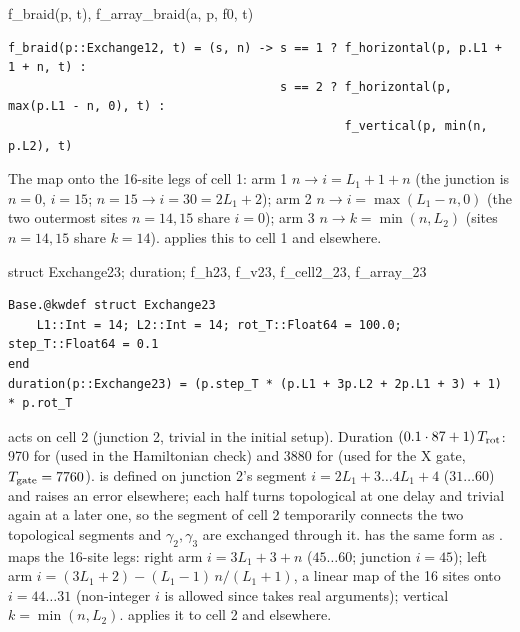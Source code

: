 \begin{function}{f\_braid(p, t), f\_array\_braid(a, p, f0, t)}
\begin{Verbatim}
f_braid(p::Exchange12, t) = (s, n) -> s == 1 ? f_horizontal(p, p.L1 + 1 + n, t) :
                                      s == 2 ? f_horizontal(p, max(p.L1 - n, 0), t) :
                                               f_vertical(p, min(n, p.L2), t)
\end{Verbatim}
The map onto the 16-site legs of cell 1: arm 1 $n\to i = L_1+1+n$ (the junction is $n=0$, $i = 15$; $n = 15\to i = 30 = 2L_1+2$);
arm 2 $n\to i = \max(L_1 - n, 0)$ (the two outermost sites $n = 14, 15$ share $i=0$); arm 3 $n\to k = \min(n, L_2)$ (sites $n = 14, 15$
share $k = 14$).  applies this to cell 1 and  elsewhere.
\end{function}

\begin{function}{struct Exchange23; duration; f\_h23, f\_v23, f\_cell2\_23, f\_array\_23}
\begin{Verbatim}
Base.@kwdef struct Exchange23
    L1::Int = 14; L2::Int = 14; rot_T::Float64 = 100.0; step_T::Float64 = 0.1
end
duration(p::Exchange23) = (p.step_T * (p.L1 + 3p.L2 + 2p.L1 + 3) + 1) * p.rot_T
\end{Verbatim}
 acts on cell 2 (junction 2, trivial in the initial setup). Duration $(0.1\cdot87+1)\,T_{\rm rot}$: 970 for
 (used in the Hamiltonian check) and 3880 for  (used for the X gate, $T_{\rm gate} = 7760$).
 is defined on junction 2's segment $i = 2L_1+3\dots4L_1+4$ ($31\dots60$) and raises an error elsewhere; each half
turns topological at one delay and trivial again at a later one, so the segment of cell 2 temporarily connects the two topological
segments and $\gamma_2,\gamma_3$ are exchanged through it.  has the same form as .
 maps the 16-site legs: right arm $i = 3L_1+3+n$ ($45\dots60$; junction $i = 45$); left arm
$i = (3L_1+2) - (L_1-1)\,n/(L_1+1)$, a linear map of the 16 sites onto $i = 44\dots31$ (non-integer $i$ is allowed since 
takes real arguments); vertical $k = \min(n, L_2)$.  applies it to cell 2 and  elsewhere.
\end{function}

